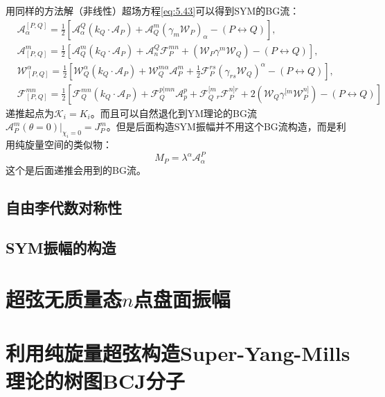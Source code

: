 用同样的方法解（非线性）超场方程\ref{eq:5.43}可以得到SYM的BG流：\cite{Lee:2015upy}
\begin{equation}
	\begin{aligned}
		&\mathcal{A}_{\alpha}^{[P,Q]}=\frac{1}{2}\left[\mathcal{A}_\alpha^  {Q}(k_Q\cdot\mathcal{A}_P)+\mathcal{A}_  {Q}^m(\gamma_m\mathcal{W}_P)_\alpha-(P\leftrightarrow  {Q})\right],\\&\mathcal{A}_{[P,  {Q}]}^m=\frac{1}{2}\left[\mathcal{A}_Q^m(k_Q\cdot\mathcal{A}_P)+\mathcal{A}_n^Q\mathcal{F}_P^{mn}+(\mathcal{W}_P\gamma^m\mathcal{W}_  {Q})-(P\leftrightarrow  Q)\right],\\&\mathcal{W}_{[P,  {Q}]}^{\alpha}=\frac{1}{2}\left[\mathcal{W}_Q^\alpha(k_Q\cdot\mathcal{A}_P)+\mathcal{W}_Q^{m\alpha}\mathcal{A}_P^m+\frac{1}{2}\mathcal{F}_P^{rs}(\gamma_{rs}\mathcal{W}_Q)^\alpha-(P\leftrightarrow  Q)\right],\\&\mathcal{F}_{[  {P},  {Q}]}^{mn}=\frac{1}{2}\left[\mathcal{F}_{  {Q}}^{mn}(k_{  {Q}}\cdot\mathcal{A}_{  {P}})+\mathcal{F}_{  {Q}}^{p|mn}\mathcal{A}_{p}^{p}+\mathcal{F}_{  {Q}}^{[m}{}_{r}\mathcal{F}_{P}^{n]r}+2(\mathcal{W}_{  {Q}}\gamma^{[m}\mathcal{W}_{P}^{n]})-(P\leftrightarrow  Q)\right]
	\end{aligned}
\end{equation}
递推起点为$\mathcal{K}_i = K_i$。而且可以自然退化到YM理论的BG流$\mathcal{A}_{P}^{m}(\theta=0)|_{\chi_{i}=0}=J_{P}^{m}$。但是后面构造SYM振幅并不用这个BG流构造，而是利用纯旋量空间的类似物：
\begin{equation}
	M_P=\lambda^\alpha\mathcal{A}_\alpha^P
\end{equation}
这个是后面递推会用到的BG流。
\subsection{自由李代数对称性}

\subsection{SYM振幅的构造}

\section{超弦无质量态$n$点盘面振幅}

\section{利用纯旋量超弦构造Super-Yang-Mills理论的树图BCJ分子}